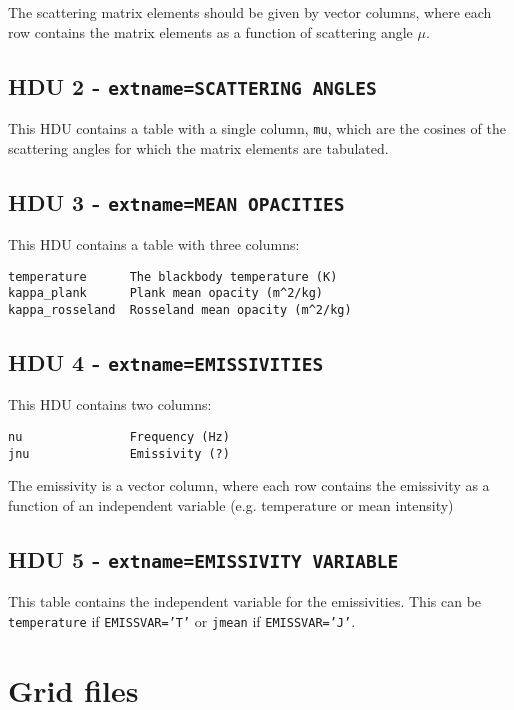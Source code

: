 \documentclass[11pt]{article}
\begin{document}
The scattering matrix elements should be given by vector columns, where each row contains the matrix elements as a function of scattering angle $\mu$.

\subsection{HDU 2 - \texttt{extname=SCATTERING ANGLES}}

This HDU contains a table with a single column, \texttt{mu}, which are the cosines of the scattering angles for which the matrix elements are tabulated.

\subsection{HDU 3 - \texttt{extname=MEAN OPACITIES}}

This HDU contains a table with three columns:

\begin{verbatim}
temperature      The blackbody temperature (K)
kappa_plank      Plank mean opacity (m^2/kg)
kappa_rosseland  Rosseland mean opacity (m^2/kg)
\end{verbatim}

\subsection{HDU 4 - \texttt{extname=EMISSIVITIES}}

This HDU contains two columns:

\begin{verbatim}
nu               Frequency (Hz)
jnu              Emissivity (?)
\end{verbatim}

The emissivity is a vector column, where each row contains the emissivity as a function of an independent variable (e.g. temperature or mean intensity)

\subsection{HDU 5 - \texttt{extname=EMISSIVITY VARIABLE}}

This table contains the independent variable for the emissivities. This can be \texttt{temperature} if \texttt{EMISSVAR='T'} or \texttt{jmean} if \texttt{EMISSVAR='J'}.

\section{Grid files}
\end{document}
